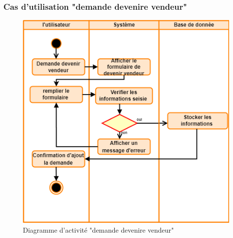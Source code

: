 \documentclass[edit,12pt,a4paper,ChapStyle,oneside,doubleinterligne]{report}
\begin{document}
\subsubsection{Cas d'utilisation "demande devenire vendeur"}
\begin{figure}[h!]\label{fig:activite demande}
    \centering
    \includegraphics[width=1\textwidth]{images/activite demande devenire vender.png}
    \caption{Diagramme d'activité "demande devenire vendeur"}
\end{figure}
\clearpage
\end{document}
